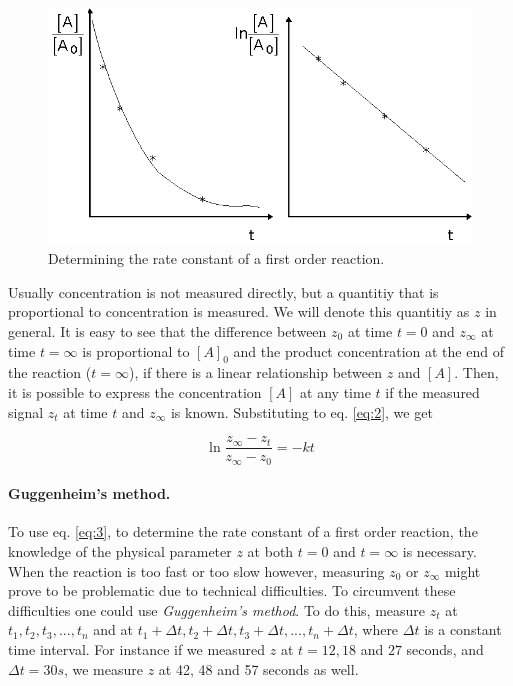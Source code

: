 \begin{figure}[b]
\centering
\includegraphics{fig/els1.eps}
\caption{Determining the rate constant of a first order reaction.}
\label{fig:els_1}
\end{figure}

Usually concentration is not measured directly, but a quantitiy that is proportional to concentration is measured. We will denote this quantitiy as $z$ in general.
It is easy to see that the difference between $z_0$ at time $t = 0$ and $z_\infty$ at time $t = \infty$ is proportional to $[A]_0$ and the product concentration at the end of the reaction ($t = \infty$), if there is a linear relationship between $z$ and $[A]$.
Then, it is possible to express the concentration $[A]$ at any time $t$ if the measured signal $z_t$ at time $t$ and $z_{\infty}$ is known.
Substituting to eq. \ref{eq:2}, we get

\begin{equation}
\label{eq:3}
        \ln 
        \frac{z_{\infty}-z_t}{z_{\infty}-z_0}
        =
        - k
        t
\end{equation}


\paragraph{Guggenheim's method.}
To use eq. \ref{eq:3}, to determine the rate constant of a first order reaction, the knowledge of the physical parameter $z$ at both $t=0$ and $t=\infty$ is necessary.
When the reaction is too fast or too slow however, measuring $z_0$ or $z_\infty$ might prove to be problematic due to technical difficulties.
To circumvent these difficulties one could use \emph{Guggenheim's method}. To do this, measure $z_t$ at $t_1, t_2, t_3, ... , t_n$ and at $t_1+\Delta t, t_2+\Delta t, t_3+\Delta t, ... , t_n+\Delta t$, where $\Delta t$ is a constant time interval.
For instance if we measured $z$ at $t= 12, 18$ and $27$ seconds, and $\Delta t = 30 s$, we measure $z$ at 42, 48 and 57 seconds as well.

